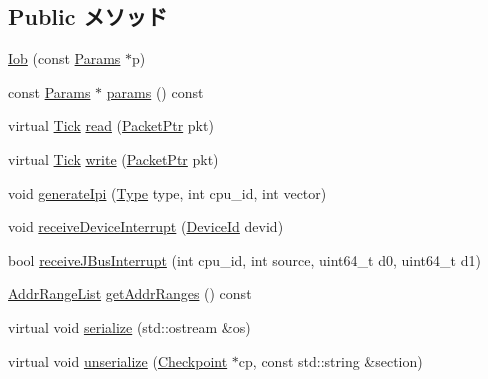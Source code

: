 \subsection*{Public メソッド}
\begin{DoxyCompactItemize}
\item 
\hyperlink{classIob_a6b17dd15918c015374327e292dca92f3}{Iob} (const \hyperlink{classIob_a177ee3cfebf080ab43aa1b8310f520b1}{Params} $\ast$p)
\item 
const \hyperlink{classIob_a177ee3cfebf080ab43aa1b8310f520b1}{Params} $\ast$ \hyperlink{classIob_acd3c3feb78ae7a8f88fe0f110a718dff}{params} () const 
\item 
virtual \hyperlink{base_2types_8hh_a5c8ed81b7d238c9083e1037ba6d61643}{Tick} \hyperlink{classIob_a613ec7d5e1ec64f8d21fec78ae8e568e}{read} (\hyperlink{classPacket}{PacketPtr} pkt)
\item 
virtual \hyperlink{base_2types_8hh_a5c8ed81b7d238c9083e1037ba6d61643}{Tick} \hyperlink{classIob_a4cefab464e72b5dd42c003a0a4341802}{write} (\hyperlink{classPacket}{PacketPtr} pkt)
\item 
void \hyperlink{classIob_a3c0c6341079a8c15a7903e450c4dc1e5}{generateIpi} (\hyperlink{classIob_a1d1cfd8ffb84e947f82999c682b666a7}{Type} type, int cpu\_\-id, int vector)
\item 
void \hyperlink{classIob_a2f2af5343177e6cd711a25e3d34bbc85}{receiveDeviceInterrupt} (\hyperlink{classIob_a066ce0277195d2858dd73d3f2c5f48c4}{DeviceId} devid)
\item 
bool \hyperlink{classIob_abfe9b96f27c7834ff2c1302d6afea7c0}{receiveJBusInterrupt} (int cpu\_\-id, int source, uint64\_\-t d0, uint64\_\-t d1)
\item 
\hyperlink{classstd_1_1list}{AddrRangeList} \hyperlink{classIob_a36cf113d5e5e091ebddb32306c098fae}{getAddrRanges} () const 
\item 
virtual void \hyperlink{classIob_a53e036786d17361be4c7320d39c99b84}{serialize} (std::ostream \&os)
\item 
virtual void \hyperlink{classIob_af22e5d6d660b97db37003ac61ac4ee49}{unserialize} (\hyperlink{classCheckpoint}{Checkpoint} $\ast$cp, const std::string \&section)
\end{DoxyCompactItemize}
